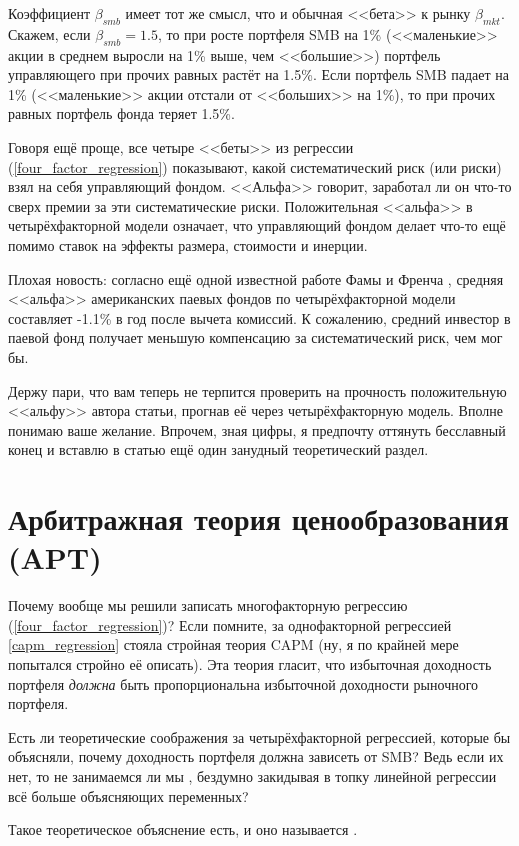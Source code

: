 Коэффициент $\beta_{smb}$ имеет тот же смысл, что и обычная <<бета>> к рынку $\beta_{mkt}$. Скажем, если $\beta_{smb}=1.5$, то при росте портфеля SMB на 1\% (<<маленькие>> акции в среднем выросли на 1\% выше, чем <<большие>>) портфель управляющего при прочих равных растёт на 1.5\%. Если портфель SMB падает на 1\% (<<маленькие>> акции отстали от <<больших>> на 1\%), то при прочих равных портфель фонда теряет 1.5\%.

Говоря ещё проще, все четыре <<беты>> из регрессии (\ref{four_factor_regression}) показывают, какой систематический риск (или риски) взял на себя управляющий фондом. <<Альфа>> говорит, заработал ли он что-то сверх премии за эти систематические риски. Положительная <<альфа>> в четырёхфакторной модели означает, что управляющий фондом делает что-то ещё помимо ставок на эффекты размера, стоимости и инерции.

Плохая новость: согласно ещё одной известной работе Фамы и Френча \cite{fama2010luck}, средняя <<альфа>> американских паевых фондов по четырёхфакторной модели составляет -1.1\% в год после вычета комиссий. К сожалению, средний инвестор в паевой фонд получает меньшую компенсацию за систематический риск, чем мог бы.

Держу пари, что вам теперь не терпится проверить на прочность положительную <<альфу>> автора статьи, прогнав её через четырёхфакторную модель. Вполне понимаю ваше желание. Впрочем, зная цифры, я предпочту оттянуть бесславный конец и вставлю в статью ещё один занудный теоретический раздел.

\section*{Арбитражная теория ценообразования (APT)}

Почему вообще мы решили записать многофакторную регрессию (\ref{four_factor_regression})? Если помните, за однофакторной регрессией \ref{capm_regression} стояла стройная теория CAPM (ну, я по крайней мере попытался стройно её описать). Эта теория гласит, что избыточная доходность портфеля \emph{должна} быть пропорциональна избыточной доходности рыночного портфеля.

Есть ли теоретические соображения за четырёхфакторной регрессией, которые бы объясняли, почему доходность портфеля должна зависеть от SMB? Ведь если их нет, то не занимаемся ли мы , бездумно закидывая в топку линейной регрессии всё больше объясняющих переменных?

Такое теоретическое объяснение есть, и оно называется .

